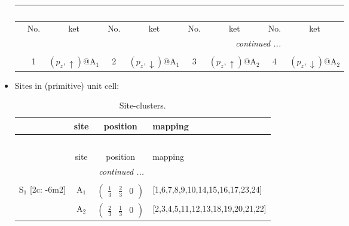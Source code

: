 \documentclass[fleqn,10pt,landscape]{article}
\begin{document}
\begin{itemize}
\begin{center}
\begin{longtable}{c|cc|cc|cc|cc}
\multicolumn{8}{l}{\tablename\ \thetable{}} \\
 \hline \hline
 & No. & ket & No. & ket & No. & ket & No. & ket \\ \hline \endhead

 \hline \hline
\multicolumn{8}{r}{\footnotesize\it continued ...} \\ \endfoot

 \hline \hline
\multicolumn{8}{r}{} \\ \endlastfoot

 & 1 & $(p_{z},\uparrow)$@A$_{1}$ & 2 & $(p_{z},\downarrow)$@A$_{1}$ & 3 & $(p_{z},\uparrow)$@A$_{2}$ & 4 & $(p_{z},\downarrow)$@A$_{2}$ \\
\end{longtable}
\end{center}

\item Sites in (primitive) unit cell:
\begin{center}
\renewcommand{\arraystretch}{1.3}
\begin{longtable}{cc|c|l}
\caption{Site-clusters.}
 \\
 \hline \hline
 & site & position & mapping \\ \hline \endfirsthead

\multicolumn{3}{l}{\tablename\ \thetable{}} \\
 \hline \hline
 & site & position & mapping \\ \hline \endhead

 \hline \hline
\multicolumn{3}{r}{\footnotesize\it continued ...} \\ \endfoot

 \hline \hline
\multicolumn{3}{r}{} \\ \endlastfoot

S$_{1}$ [2c: -6m2] & A$_1$ & $\begin{pmatrix} \frac{1}{3} & \frac{2}{3} & 0 \end{pmatrix}$ & [1,6,7,8,9,10,14,15,16,17,23,24] \\
& A$_2$ & $\begin{pmatrix} \frac{2}{3} & \frac{1}{3} & 0 \end{pmatrix}$ & [2,3,4,5,11,12,13,18,19,20,21,22] \\
\end{longtable}
\end{center}


\end{itemize}
\end{document}
